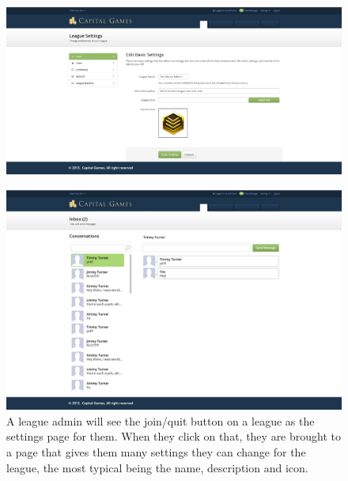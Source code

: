 \begin{figure}
\centering
\includegraphics[width=5.5in]{./mockups/JPEG/leagueadmin.jpg}
\end{figure}



\begin{figure}
\centering
\includegraphics[width=5.5in]{./mockups/JPEG/messages.jpg}
\caption{A league admin will see the join/quit button on a league as the settings page for them. When they click on that, they are brought to a page that gives them many settings they can change for the league, the most typical being the name, description and icon.}
\end{figure}

